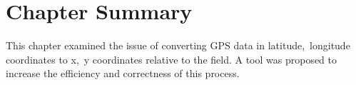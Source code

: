 \section{Chapter Summary}




This chapter examined the issue of converting GPS data in latitude,~longitude coordinates to x,~y coordinates relative to the field. A tool was proposed to increase the efficiency and correctness of this process.

